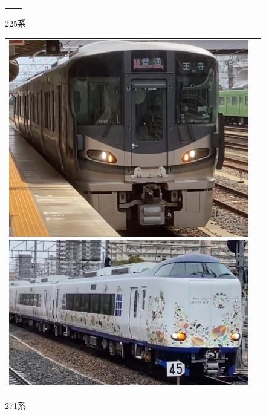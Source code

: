 \begin{figure}[htbp]
\begin{tabular}{cc}
\begin{minipage}[b]{0.15\textwidth}
		\caption{225系}
		\label{fig:225}
	\end{minipage}
	\end{tabular}
\end{figure}

\begin{figure}[htbp]
	\begin{tabular}{cc}
		\begin{minipage}[b]{0.15\linewidth}
			\centering
			\includegraphics[width=\linewidth]{densya/227.png}
			\caption{227系}
			\label{fig:227}
		\end{minipage}
		\begin{minipage}[b]{0.15\textwidth}
			\includegraphics[width=\linewidth]{densya/271.png}
			\caption{271系}
			\label{fig:271}
		\end{minipage}

\end{tabular}
\end{figure}

